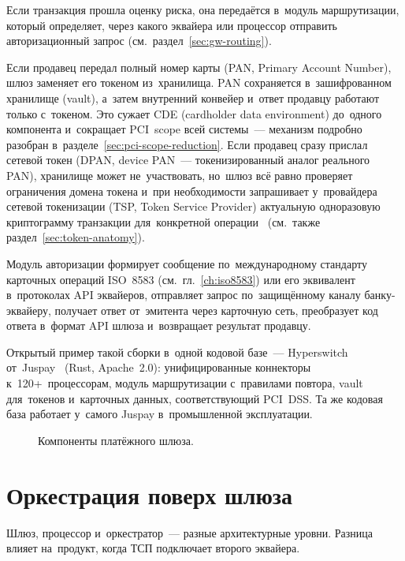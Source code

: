 Если транзакция прошла оценку риска, она передаётся в~модуль маршрутизации,
который определяет, через какого эквайера или процессор отправить
авторизационный запрос (см.~раздел~\ref{sec:gw-routing}).

Если продавец передал полный номер карты (PAN, Primary Account Number), шлюз
заменяет его токеном из~хранилища. PAN сохраняется в~зашифрованном хранилище
(vault), а~затем внутренний конвейер и~ответ продавцу работают только
с~токеном. Это сужает CDE (cardholder data environment) до~одного компонента
и~сокращает PCI~scope всей системы~--- механизм подробно разобран
в~разделе~\ref{sec:pci-scope-reduction}. Если продавец сразу прислал
сетевой токен (DPAN, device PAN~--- токенизированный аналог реального PAN),
хранилище может не~участвовать, но~шлюз всё равно проверяет ограничения домена
токена и~при необходимости запрашивает у~провайдера сетевой токенизации (TSP,
Token Service Provider) актуальную одноразовую криптограмму транзакции
для~конкретной операции~\cite{emvco-payment-tokenisation-guide} (см.~также
раздел~\ref{sec:token-anatomy}).

Модуль авторизации формирует сообщение по~международному стандарту карточных
операций ISO~8583 (см.~гл.~\ref{ch:iso8583}) или его эквивалент в~протоколах
API эквайеров, отправляет запрос по~защищённому каналу банку-эквайеру,
получает ответ от~эмитента через карточную сеть, преобразует код ответа
в~формат API шлюза и~возвращает результат продавцу.

Открытый пример такой сборки в~одной кодовой базе~---
Hyperswitch от~Juspay~\cite{hyperswitch-juspay} (Rust, Apache~2.0):
унифицированные коннекторы к~120+~процессорам, модуль маршрутизации с~правилами
повтора, vault для~токенов и~карточных данных, соответствующий PCI~DSS. Та же
кодовая база работает у~самого Juspay в~промышленной эксплуатации.

\begin{figure}[htbp]
  \centering
  \caption{Компоненты платёжного шлюза.}\label{fig:gateway-components}
\end{figure}

\section{Оркестрация поверх шлюза}\label{sec:gw-orchestration-layer}

Шлюз, процессор и~оркестратор~--- разные архитектурные уровни. Разница влияет
на~продукт, когда ТСП подключает второго эквайера.


